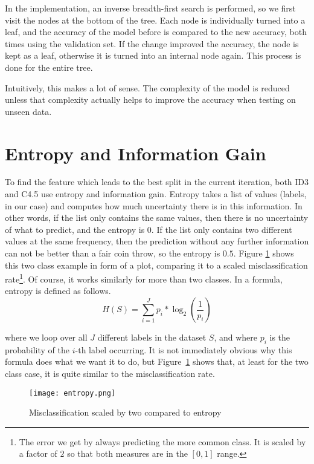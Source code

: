 \documentclass[a4paper]{article}
\begin{document}
In the implementation, an inverse breadth-first search is performed, so we first visit the nodes at the bottom of the tree. Each node is individually turned into a leaf, and the accuracy of the model before is compared to the new accuracy, both times using the validation set. If the change improved the accuracy, the node is kept as a leaf, otherwise it is turned into an internal node again. This process is done for the entire tree.

Intuitively, this makes a lot of sense. The complexity of the model is reduced unless that complexity actually helps to improve the accuracy when testing on unseen data.

\section{Entropy and Information Gain}
\label{sec:entropy}

To find the feature which leads to the best split in the current iteration, both ID3 and C4.5 use entropy and information gain. Entropy takes a list of values (labels, in our case) and computes how much uncertainty there is in this information. In other words, if the list only contains the same values, then there is no uncertainty of what to predict, and the entropy is $0$. If the list only contains two different values at the same frequency, then the prediction without any further information can not be better than a fair coin throw, so the entropy is $0.5$. Figure \ref{fig:entropy} shows this two class example in form of a plot, comparing it to a scaled misclassification rate\footnote{The error we get by always predicting the more common class. It is scaled by a factor of $2$ so that both measures are in the $[0, 1]$ range.}. Of course, it works similarly for more than two classes. In a formula, entropy is defined as follows.
\[
	H(S) = \sum\limits_{i = 1}^J p_i * \log_2\left(\frac{1}{p_i}\right)
\]

\noindent where we loop over all $J$ different labels in the dataset $S$, and where $p_i$ is the probability of the $i$-th label occurring.  It is not immediately obvious why this formula does what we want it to do, but Figure~\ref{fig:entropy} shows that, at least for the two class case, it is quite similar to the misclassification rate.

\begin{figure}[h]
	\texttt{[image: entropy.png]}
    \caption{Misclassification scaled by two compared to entropy}
    \label{fig:entropy}
\end{figure}
\end{document}
